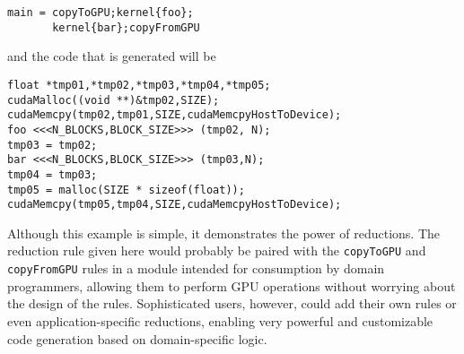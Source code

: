 \begin{verbatim}
main = copyToGPU;kernel{foo};
       kernel{bar};copyFromGPU
\end{verbatim}

and the code that is generated will be

\begin{verbatim}
float *tmp01,*tmp02,*tmp03,*tmp04,*tmp05;
cudaMalloc((void **)&tmp02,SIZE);
cudaMemcpy(tmp02,tmp01,SIZE,cudaMemcpyHostToDevice);
foo <<<N_BLOCKS,BLOCK_SIZE>>> (tmp02, N);
tmp03 = tmp02;
bar <<<N_BLOCKS,BLOCK_SIZE>>> (tmp03,N);
tmp04 = tmp03;
tmp05 = malloc(SIZE * sizeof(float));
cudaMemcpy(tmp05,tmp04,SIZE,cudaMemcpyHostToDevice);
\end{verbatim}

Although this example is simple, it demonstrates the power of reductions. The
reduction rule given here would probably be paired with the \texttt{copyToGPU}
and \texttt{copyFromGPU} rules in a module intended for consumption by domain
programmers, allowing them to perform GPU operations without worrying about the
design of the rules. Sophisticated users, however, could add their own rules or
even application-specific reductions, enabling very powerful and customizable
code generation based on domain-specific logic.
